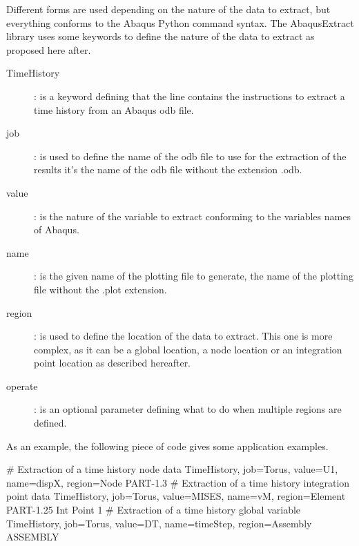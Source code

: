 Different forms are used depending on the nature of the data to extract, but everything conforms to the Abaqus Python command syntax. The \textsf{AbaqusExtract} library uses some keywords to define the nature of the data to extract as proposed here after.
\begin{description}
\item [TimeHistory]: is a keyword defining that the line contains the instructions to extract a time history from an Abaqus \textsf{odb} file.
\item [job]: is used to define the name of the odb file to use for the extraction of the results \ie it's the name of the \textsf{odb} file without the extension \textsf{.odb}.
\item [value]: is the nature of the variable to extract conforming to the variables names of Abaqus.
\item [name]: is the given name of the plotting file to generate, \ie the name of the plotting file without the \textsf{.plot} extension.
\item [region]: is used to define the location of the data to extract. This one is more complex, as it can be a global location, a node location or an integration point location as described hereafter.
\item [operate]: is an optional parameter defining what to do when multiple regions are defined.
\end{description}
As an example, the following piece of code gives some application examples.

\begin{PythonListing}
# Extraction of a time history node data
TimeHistory, job=Torus, value=U1, name=dispX, region=Node PART-1.3
# Extraction of a time history integration point data
TimeHistory, job=Torus, value=MISES, name=vM, region=Element PART-1.25 Int Point 1
# Extraction of a time history global variable
TimeHistory, job=Torus, value=DT, name=timeStep, region=Assembly ASSEMBLY
\end{PythonListing}

